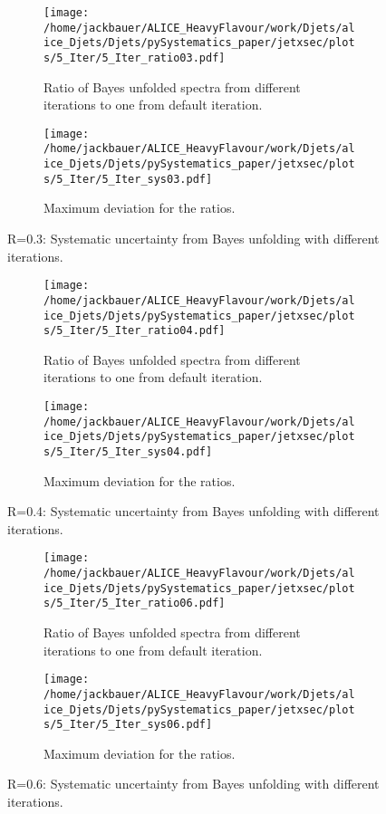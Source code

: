 \begin{figure}
\centering
\begin{subfigure}{.5\textwidth}
  \centering
  \texttt{[image: /home/jackbauer/ALICE\_HeavyFlavour/work/Djets/alice\_Djets/Djets/pySystematics\_paper/jetxsec/plots/5\_Iter/5\_Iter\_ratio03.pdf]}
  \caption{Ratio of Bayes unfolded spectra from different iterations to one from default iteration.}
  \label{fig:sub1BayesIterSysUncR03}
\end{subfigure}%
\begin{subfigure}{.5\textwidth}
  \centering
  \texttt{[image: /home/jackbauer/ALICE\_HeavyFlavour/work/Djets/alice\_Djets/Djets/pySystematics\_paper/jetxsec/plots/5\_Iter/5\_Iter\_sys03.pdf]}
  \caption{Maximum deviation for the ratios.}
  \label{fig:sub2BayesIterSysUncR03}
\end{subfigure}
\caption{R=0.3: Systematic uncertainty from Bayes unfolding with different iterations.}
  \label{fig:BayesIterSysUncR03}
\end{figure}

\begin{figure}
\centering
\begin{subfigure}{.5\textwidth}
  \centering
  \texttt{[image: /home/jackbauer/ALICE\_HeavyFlavour/work/Djets/alice\_Djets/Djets/pySystematics\_paper/jetxsec/plots/5\_Iter/5\_Iter\_ratio04.pdf]}
  \caption{Ratio of Bayes unfolded spectra from different iterations to one from default iteration.}
  \label{fig:sub1BayesIterSysUncR04}
\end{subfigure}%
\begin{subfigure}{.5\textwidth}
  \centering
  \texttt{[image: /home/jackbauer/ALICE\_HeavyFlavour/work/Djets/alice\_Djets/Djets/pySystematics\_paper/jetxsec/plots/5\_Iter/5\_Iter\_sys04.pdf]}
  \caption{Maximum deviation for the ratios.}
  \label{fig:sub2BayesIterSysUncR04}
\end{subfigure}
\caption{R=0.4: Systematic uncertainty from Bayes unfolding with different iterations.}
  \label{fig:BayesIterSysUncR04}
\end{figure}

\begin{figure}
\centering
\begin{subfigure}{.5\textwidth}
  \centering
  \texttt{[image: /home/jackbauer/ALICE\_HeavyFlavour/work/Djets/alice\_Djets/Djets/pySystematics\_paper/jetxsec/plots/5\_Iter/5\_Iter\_ratio06.pdf]}
  \caption{Ratio of Bayes unfolded spectra from different iterations to one from default iteration.}
  \label{fig:sub1BayesIterSysUncR06}
\end{subfigure}%
\begin{subfigure}{.5\textwidth}
  \centering
  \texttt{[image: /home/jackbauer/ALICE\_HeavyFlavour/work/Djets/alice\_Djets/Djets/pySystematics\_paper/jetxsec/plots/5\_Iter/5\_Iter\_sys06.pdf]}
  \caption{Maximum deviation for the ratios.}
  \label{fig:sub2BayesIterSysUncR06}
\end{subfigure}
\caption{R=0.6: Systematic uncertainty from Bayes unfolding with different iterations.}
  \label{fig:BayesIterSysUncR06}
\end{figure}

